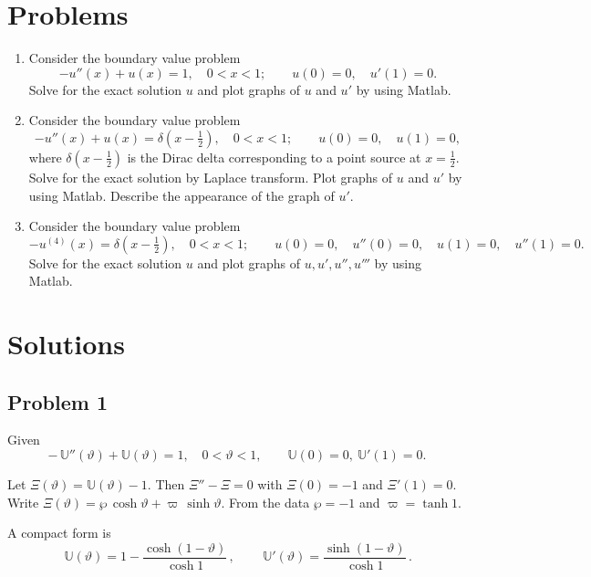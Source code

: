 \documentclass[12pt, a4paper]{article}
\begin{document}
\newpage
\section*{Problems}

\begin{enumerate}[leftmargin=1.2em,label=\arabic*.]
  \item Consider the boundary value problem
  \[
    -u''(x) + u(x) = 1,\quad 0<x<1;\qquad u(0)=0,\quad u'(1)=0.
  \]
  Solve for the exact solution \(u\) and plot graphs of \(u\) and \(u'\) by using Matlab.

  \item Consider the boundary value problem
  \[
    -u''(x) + u(x) = \delta\!\left(x-\tfrac{1}{2}\right),\quad 0<x<1;\qquad
    u(0)=0,\quad u(1)=0,
  \]
  where \(\delta(x-\tfrac{1}{2})\) is the Dirac delta corresponding to a point source at \(x=\tfrac{1}{2}\).
  Solve for the exact solution by Laplace transform. Plot graphs of \(u\) and \(u'\) by using Matlab. Describe the appearance of the graph of \(u'\).

  \item Consider the boundary value problem
  \[
    -u^{(4)}(x)=\delta\!\left(x-\tfrac{1}{2}\right),\quad 0<x<1;\qquad
    u(0)=0,\quad u''(0)=0,\quad u(1)=0,\quad u''(1)=0.
  \]
  Solve for the exact solution \(u\) and plot graphs of \(u,u',u'',u'''\) by using Matlab.
\end{enumerate}

\newpage
\section*{Solutions}

\subsection*{Problem 1}

Given
\[
-\,\mathbb{U}''(\vartheta)+\mathbb{U}(\vartheta)=1,\quad 0<\vartheta<1,\qquad \mathbb{U}(0)=0,\ \mathbb{U}'(1)=0 .
\]

Let \(\Xi(\vartheta)=\mathbb{U}(\vartheta)-1\). Then \(\Xi''-\Xi=0\) with \(\Xi(0)=-1\) and \(\Xi'(1)=0\).
Write \(\Xi(\vartheta)=\wp\,\cosh\vartheta+\varpi\,\sinh\vartheta\). From the data \(\wp=-1\) and \(\varpi=\tanh 1\).

A compact form is
\[
\boxed{\,\mathbb{U}(\vartheta)=1-\frac{\cosh(1-\vartheta)}{\cosh 1}\,},\qquad
\boxed{\,\mathbb{U}'(\vartheta)=\frac{\sinh(1-\vartheta)}{\cosh 1}\,}.
\]
\end{document}
